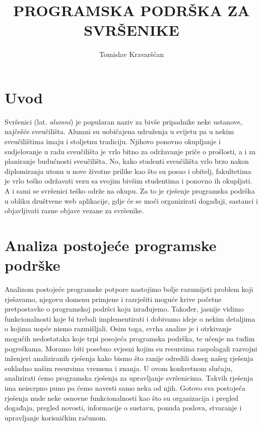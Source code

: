 \documentclass[times, utf8, zavrsni]{fer}
\begin{document}

\title{PROGRAMSKA PODRŠKA ZA SVRŠENIKE}

\author{Tomislav Kravaršćan}

\maketitle

\izvornik

\zahvala{}

\tableofcontents

\chapter{Uvod}
Svršenici (lat. \textit{alumni}) je popularan naziv za bivše pripadnike neke ustanove, najčešće sveučilišta. Alumni su uobičajena udruženja u svijetu pa u nekim sveučilištima imaju i stoljetnu tradiciju. Njihovo ponovno okupljanje i sudjelovanje u radu sveučilišta je vrlo bitno za održavanje priče o prošlosti, a i za planiranje budućnosti sveučilišta. No, kako studenti sveučilišta vrlo brzo nakon diplomiranja utonu u nove životne prilike kao što su posao i obitelj, fakultetima je vrlo teško održavati vezu sa svojim bivšim studentima i ponovno ih okupljati. A i sami se svršenici teško održe na okupu. Za to je rješenje programska podrška u obliku društvene web aplikacije, gdje će se moći organizirati događaji, sastanci i objavljivati razne objave vezane za svršenike.

\chapter{Analiza postojeće programske podrške}
Analizom postojeće programske potpore nastojimo bolje razumijeti problem koji rješavamo, njegovu domenu primjene i razrješiti moguće krive početne pretpostavke o programskoj podršci koju izrađujemo. Također, jasnije vidimo funkcionalnosti koje bi trebali implementirati i dobivamo ideje o nekim detaljima o kojima uopće nismo razmišljali. Osim toga, svrha analize je i otrkivanje mogućih nedostataka koje trpi posojeća programska podrška, te učenje na tuđim pogreškama. Moramo biti posebno svjesni kojim su resursima raspolagali razvojni inženjeri analiziranih rješenja kako bismo što ranije odredili doseg našeg rješenja sukladno našim resursima vremena i znanja.
U ovom konkretnom slučaju, analizirati ćemo programska rješenja za upravljanje svršenicima. Takvih rješenja ima neiscrpno puno pa ćemo navesti samo neka od njih. Gotovo sva postojeća rješenja nude neke osnovne funkcionalnosti kao što su organizacija i pregled događaja, pregled novosti, informacije o sustavu, ponuda poslova, stvaranje i upravljanje korisničkim računom.
\end{document}

